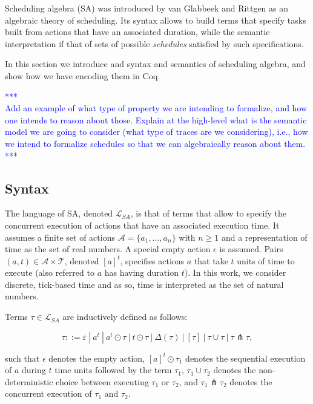 \documentclass{article}
\begin{document}
Scheduling algebra (SA) was introduced by van Glabbeek and Rittgen \cite{} as an algebraic theory of scheduling. Its syntax allows to build terms that specify tasks built from actions that have an associated duration, while the semantic interpretation if that of sets of possible {\em schedules} satisfied by such specifications. 


In this section we introduce and syntax and semantics of scheduling algebra, and show how we have encoding them in Coq. 

\textcolor{blue}{*** \\
Add an example of what type of property we are intending to formalize, and how one intends to reason about those. Explain at the high-level what is the semantic model we are going to consider (what type of traces are we considering), i.e., how we intend to formalize schedules so that we can algebraically reason about them.\\ 
***}

\subsection{Syntax}
\label{sec:1_1}
The language of {\sf SA}, denoted $\mathcal{L}_{SA}$, is that of terms that allow to specify the concurrent execution of actions that have an associated execution time. It assumes a finite set of actions $\mathcal{A} = \{a_1,\ldots,a_n\}$ with $n \geq 1$ and a representation of time as the set of real numbers. A special empty action $\epsilon$ is assumed. Pairs $(a,t) \in \mathcal{A}\times\mathcal{T}$, denoted $[a]^t$, specifies actions $a$ that take $t$ units of time to execute (also referred to $a$ has having duration $t$). In this work, we consider discrete, tick-based time and as so, time is interpreted as the set of natural numbers.

Terms $\tau \in \mathcal{L}_{SA}$ are inductively defined as follows: 

$$
\tau ::= \varepsilon\:|\:a^t\:|\: a^t \odot \tau\:|\:t \odot \tau\:|\:\Delta(\tau)\:|\:[\tau]\:|\:\tau \cup \tau\:|\:\tau \pitchfork \tau,
$$

such that $\epsilon$ denotes the empty action, $[a]^t \odot \tau_1$ denotes the sequential execution of $a$ during $t$ time units followed by the term $\tau_1$, $\tau_1 \cup \tau_2$ denotes the non-deterministic choice between executing $\tau_1$ or $\tau_2$, and $\tau_1 \pitchfork \tau_2$ denotes the concurrent execution of $\tau_1$ and $\tau_2$.
\end{document}
